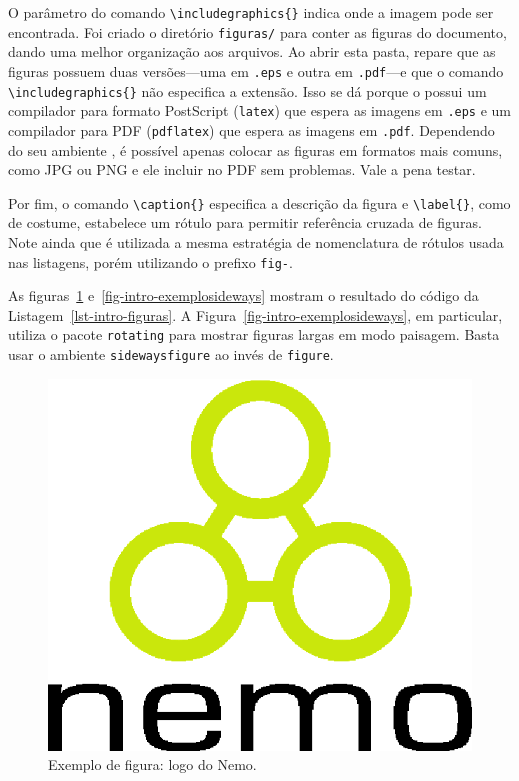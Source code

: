 O parâmetro do comando \texttt{\textbackslash includegraphics\{\}} indica onde a imagem pode ser encontrada. Foi criado o diretório \texttt{figuras/} para conter as figuras do documento, dando uma melhor organização aos arquivos. Ao abrir esta pasta, repare que as figuras possuem duas versões---uma em \texttt{.eps} e outra em \texttt{.pdf}---e que o comando \texttt{\textbackslash includegraphics\{\}} não especifica a extensão. Isso se dá porque o \latex possui um compilador para formato PostScript (\texttt{latex}) que espera as imagens em \texttt{.eps} e um compilador para PDF (\texttt{pdflatex}) que espera as imagens em \texttt{.pdf}. Dependendo do seu ambiente \latex, é possível apenas colocar as figuras em formatos mais comuns, como JPG ou PNG e ele incluir no PDF sem problemas. Vale a pena testar.

Por fim, o comando \texttt{\textbackslash caption\{\}} especifica a descrição da figura e \texttt{\textbackslash label\{\}}, como de costume, estabelece um rótulo para permitir referência cruzada de figuras. Note ainda que é utilizada a mesma estratégia de nomenclatura de rótulos usada nas listagens, porém utilizando o prefixo \texttt{fig-}.

As figuras~\ref{fig-intro-nemologo} e~\ref{fig-intro-exemplosideways} mostram o resultado do código da Listagem~\ref{lst-intro-figuras}. A Figura~\ref{fig-intro-exemplosideways}, em particular, utiliza o pacote \texttt{rotating} para mostrar figuras largas em modo paisagem. Basta usar o ambiente \texttt{sidewaysfigure} ao invés de \texttt{figure}.

\begin{figure}
	\centering
	\includegraphics[width=.25\textwidth]{figuras/fig-intro-nemologo} 
	\caption{Exemplo de figura: logo do Nemo.}
	\label{fig-intro-nemologo}
\end{figure}

